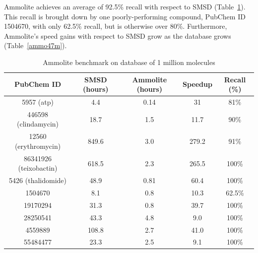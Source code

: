 \documentclass[11pt]{elsarticle}
\theoremstyle{definition}
\theoremstyle{remark}
\numberwithin{equation}{section}
\begin{document}
Ammolite achieves an average of 92.5\% recall with respect to SMSD (Table~\ref{ammo1m}). This recall is brought down by one poorly-performing compound, PubChem ID 1504670, with only 62.5\% recall, but is otherwise over 80\%.
Furthermore, Ammolite's speed gains with respect to SMSD grow as the database grows (Table~\ref{ammo47m}).
\begin{table}
    \caption{Benchmarks of Ammolite vs. SMSD on databases of (a) 1 million molecules and (b) 47 million molecules (all of PubChem)}


\begin{subtable}{1\textwidth}
\caption{Ammolite benchmark on database of 1 million molecules}
\label{ammo1m}
\begin{tabular}{ccccc}
\hline
PubChem ID & SMSD (hours) & Ammolite (hours) & Speedup & Recall (\%) \\
\hline
5957 (atp) & 4.4 & 0.14 & 31 & 81\% \\
\hline
446598 (clindamycin) & 18.7 & 1.5 & 11.7 & 90\% \\
\hline
12560 (erythromycin) & 849.6 & 3.0 & 279.2 & 91\% \\
\hline
86341926 (teixobactin) & 618.5 & 2.3 & 265.5 & 100\% \\
\hline
5426 (thalidomide) & 48.9 & 0.81 & 60.4 & 100\% \\
\hline
1504670 & 8.1 & 0.8 & 10.3 & 62.5\% \\
\hline
19170294 & 31.3 & 0.8 & 39.7 & 100\% \\
\hline
28250541 & 43.3 & 4.8 & 9.0 & 100\% \\
\hline
4559889 & 108.8 & 2.7 & 41.0 & 100\% \\
\hline
55484477 & 23.3 & 2.5 & 9.1 & 100\% \\
\hline

\end{tabular}
\end{subtable}

\vspace{1em}


\end{table}
\end{document}
